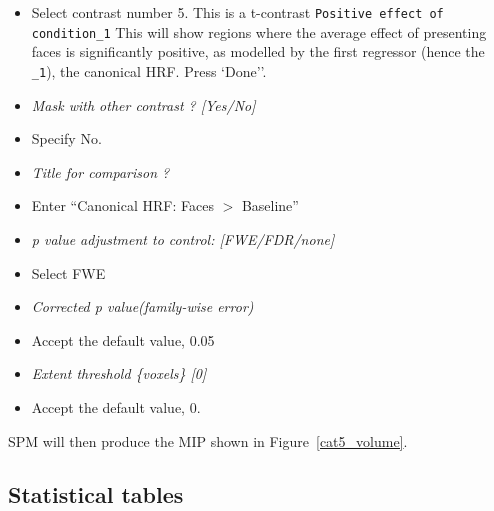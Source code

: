 \begin{itemize}
\item Select contrast number 5. This is a t-contrast \texttt{Positive effect of condition\_1} This will show regions where the average effect of presenting faces is significantly positive, as modelled by the first regressor (hence the \texttt{\_1}), the canonical HRF. Press `Done''.
\item \emph{Mask with other contrast ? [Yes/No]}
\item Specify No.
\item \emph{Title for comparison ?}
\item Enter ``Canonical HRF: Faces $>$ Baseline''
\item \emph{p value adjustment to control: [FWE/FDR/none]}
\item Select FWE
\item \emph{Corrected p value(family-wise error)}
\item Accept the default value, 0.05
\item \emph{Extent threshold \{voxels\} [0]}
\item Accept the default value, 0.
\end{itemize}
SPM will then produce the MIP shown in Figure~\ref{cat5_volume}.

\subsection{Statistical tables}

